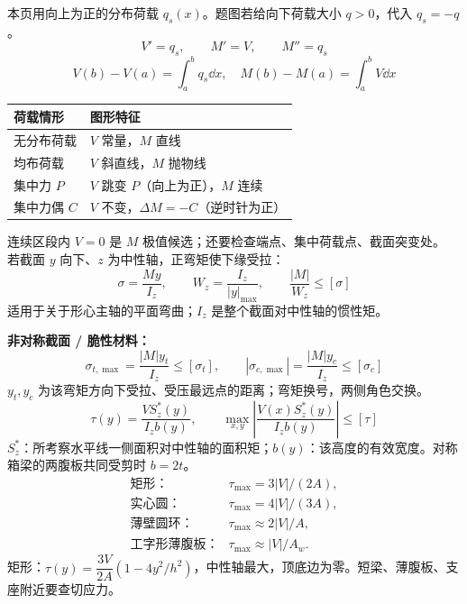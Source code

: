 \documentclass[a4paper,10pt,fontset=none]{ctexart}
\begin{document}
\clearpage
{}
\begin{leftcol}
本页用向上为正的分布荷载 $q_s(x)$。题图若给向下荷载大小 $q>0$，代入 $q_s=-q$。
\[
\boxed{V'=q_s,\qquad M'=V,\qquad M''=q_s}
\]
\[
V(b)-V(a)=\int_a^bq_s\dd x,\quad
M(b)-M(a)=\int_a^bV\dd x
\]
\par\begin{tabularx}{\linewidth}{@{}lX@{}}
\toprule
荷载情形 & 图形特征\\\midrule
无分布荷载 & $V$ 常量，$M$ 直线\\
均布荷载 & $V$ 斜直线，$M$ 抛物线\\
集中力 $P$ & $V$ 跳变 $P$（向上为正），$M$ 连续\\
集中力偶 $C$ & $V$ 不变，$\Delta M=-C$（逆时针为正）\\
\bottomrule
\end{tabularx}\par
连续区段内 $V=0$ 是 $M$ 极值候选；还要检查端点、集中荷载点、截面突变处。
若截面 $y$ 向下、$z$ 为中性轴，正弯矩使下缘受拉：
\[
\boxed{\sigma=\frac{My}{I_z}},\qquad
W_z=\frac{I_z}{|y|_{\max}},\qquad \frac{|M|}{W_z}\le[\sigma]
\]
适用于关于形心主轴的平面弯曲；$I_z$ 是整个截面对中性轴的惯性矩。

\textbf{非对称截面 / 脆性材料：}
\[
\sigma_{t,\max}=\frac{|M|y_t}{I_z}\le[\sigma_t],\qquad
|\sigma_{c,\max}|=\frac{|M|y_c}{I_z}\le[\sigma_c]
\]
$y_t,y_c$ 为该弯矩方向下受拉、受压最远点的距离；弯矩换号，两侧角色交换。
\[
\boxed{\tau(y)=\frac{V S_z^*(y)}{I_z b(y)}},\qquad
\max_{x,y}\left|\frac{V(x)S_z^*(y)}{I_zb(y)}\right|\le[\tau]
\]
$S_z^*$：所考察水平线一侧面积对中性轴的面积矩；$b(y)$：该高度的有效宽度。对称箱梁的两腹板共同受剪时 $b=2t$。
\[
\begin{array}{ll}
\text{矩形：}&\tau_{\max}=3|V|/(2A),\\
\text{实心圆：}&\tau_{\max}=4|V|/(3A),\\
\text{薄壁圆环：}&\tau_{\max}\approx2|V|/A,\\
\text{工字形薄腹板：}&\tau_{\max}\approx |V|/A_w.
\end{array}
\]
矩形：$\tau(y)=\dfrac{3V}{2A}(1-4y^2/h^2)$，中性轴最大，顶底边为零。短梁、薄腹板、支座附近要查切应力。
\end{leftcol}
\end{document}
